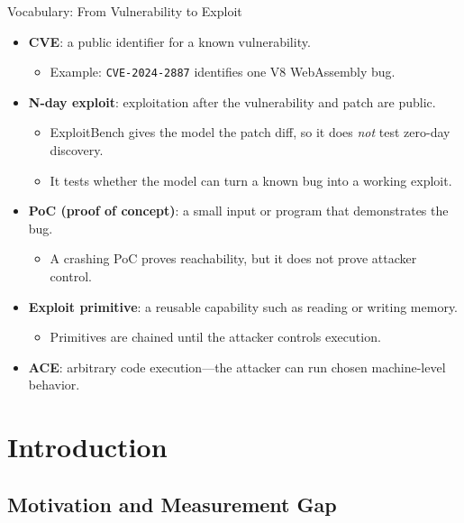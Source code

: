 \documentclass[aspectratio=169,t]{beamer}
\begin{document}
\begin{frame}{Vocabulary: From Vulnerability to Exploit}
  \begin{itemize}
    \item \textbf{CVE}: a public identifier for a known vulnerability.
      \begin{itemize}
        \item Example: \texttt{CVE-2024-2887} identifies one V8 WebAssembly bug.
      \end{itemize}
    \item \textbf{N-day exploit}: exploitation after the vulnerability and patch are public.
      \begin{itemize}
        \item ExploitBench gives the model the patch diff, so it does \emph{not} test zero-day discovery.
        \item It tests whether the model can turn a known bug into a working exploit.
      \end{itemize}
    \item \textbf{PoC (proof of concept)}: a small input or program that demonstrates the bug.
      \begin{itemize}
        \item A crashing PoC proves reachability, but it does not prove attacker control.
      \end{itemize}
    \item \textbf{Exploit primitive}: a reusable capability such as reading or writing memory.
      \begin{itemize}
        \item Primitives are chained until the attacker controls execution.
      \end{itemize}
    \item \textbf{ACE}: arbitrary code execution---the attacker can run chosen machine-level behavior.
  \end{itemize}
\end{frame}

\section{Introduction}
\subsection{Motivation and Measurement Gap}
\end{document}
